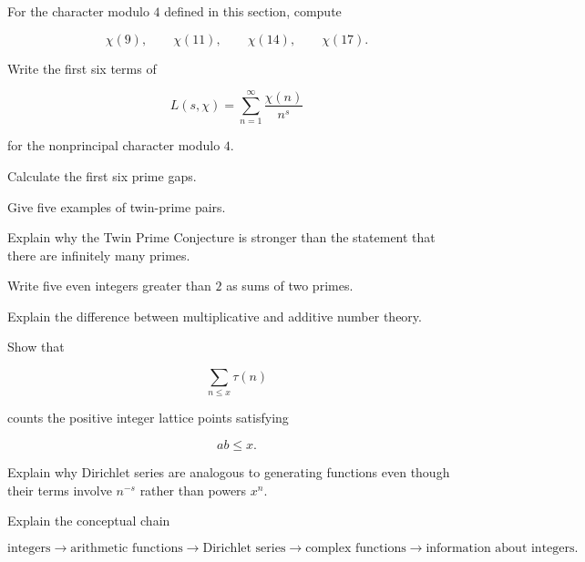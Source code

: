\begin{exercise}[2]
For the character modulo \(4\) defined in this section, compute

\[ \chi(9),\qquad\chi(11),\qquad\chi(14),\qquad\chi(17). \]
\end{exercise}

\begin{exercise}[2]
Write the first six terms of

\[ L(s,\chi)=\sum_{n=1}^{\infty}\frac{\chi(n)}{n^s} \]

for the nonprincipal character modulo \(4\).
\end{exercise}

\begin{exercise}[2]
Calculate the first six prime gaps.
\end{exercise}

\begin{exercise}[1]
Give five examples of twin-prime pairs.
\end{exercise}

\begin{exercise}[2]
Explain why the Twin Prime Conjecture is stronger than the statement that
there are infinitely many primes.
\end{exercise}

\begin{exercise}[2]
Write five even integers greater than \(2\) as sums of two primes.
\end{exercise}

\begin{exercise}[2]
Explain the difference between multiplicative and additive number theory.
\end{exercise}

\begin{exercise}[3]
Show that

\[ \sum_{n\leq x}\tau(n) \]

counts the positive integer lattice points satisfying

\[ ab\leq x. \]
\end{exercise}

\begin{exercise}[3]
Explain why Dirichlet series are analogous to generating functions even
though their terms involve \(n^{-s}\) rather than powers \(x^n\).
\end{exercise}

\begin{exercise}[3]
Explain the conceptual chain

\[
\text{integers}
\longrightarrow
\text{arithmetic functions}
\longrightarrow
\text{Dirichlet series}
\longrightarrow
\text{complex functions}
\longrightarrow
\text{information about integers}.
\]
\end{exercise}

